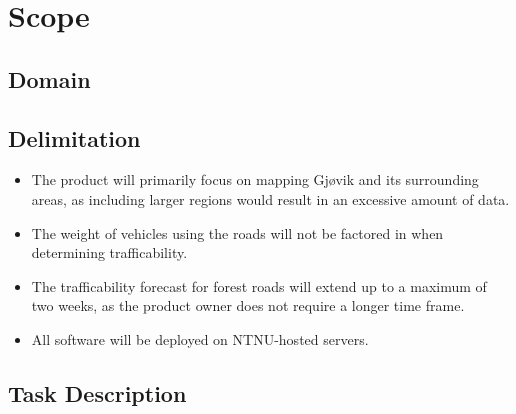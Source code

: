 \section{Scope}
\subsection{Domain}

\subsection{Delimitation}
\begin{itemize}
    \item The product will primarily focus on mapping Gjøvik and its surrounding areas, as including larger regions would result in an excessive amount of data.
    \item The weight of vehicles using the roads will not be factored in when determining trafficability.
    \item The trafficability forecast for forest roads will extend up to a maximum of two weeks, as the product owner does not require a longer time frame.
    \item All software will be deployed on NTNU-hosted servers.
\end{itemize}

\subsection{Task Description}

